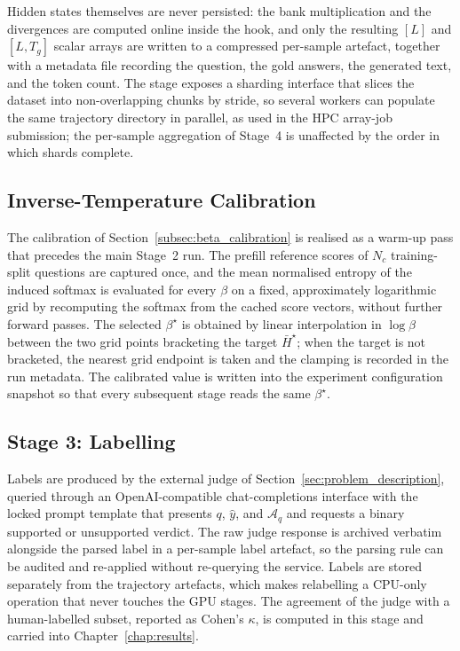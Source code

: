 Hidden states themselves are never persisted: the bank multiplication and
the divergences are computed online inside the hook, and only the resulting
$[L]$ and $[L, T_g]$ scalar arrays are written to a compressed per-sample
artefact, together with a metadata file recording the question, the gold
answers, the generated text, and the token count. The stage exposes a
sharding interface that slices the dataset into non-overlapping chunks by
stride, so several workers can populate the same trajectory directory in
parallel, as used in the HPC array-job submission; the per-sample
aggregation of Stage~4 is unaffected by the order in which shards complete.

\subsection{Inverse-Temperature Calibration}
\label{subsec:impl_beta}

The calibration of Section~\ref{subsec:beta_calibration} is realised as a
warm-up pass that precedes the main Stage~2 run. The prefill reference
scores of $N_c$ training-split questions are captured once, and the mean
normalised entropy of the induced softmax is evaluated for every $\beta$ on
a fixed, approximately logarithmic grid by recomputing the softmax from the
cached score
vectors, without further forward passes. The selected $\beta^\star$ is
obtained by linear interpolation in $\log \beta$ between the two grid
points bracketing the target $\bar{H}^\star$; when the target is not
bracketed, the nearest grid endpoint is taken and the clamping is recorded
in the run metadata. The calibrated value is written into the experiment
configuration snapshot so that every subsequent stage reads the same
$\beta^\star$.

\subsection{Stage 3: Labelling}
\label{subsec:stage3_labeling}

Labels are produced by the external judge of
Section~\ref{sec:problem_description}, queried through an OpenAI-compatible
chat-completions interface with the locked prompt template that presents
$q$, $\hat{y}$, and $\mathcal{A}_q$ and requests a binary supported or
unsupported verdict. The raw judge response is archived verbatim alongside
the parsed label in a per-sample label artefact, so the parsing rule can be
audited and re-applied without re-querying the service. Labels are stored
separately from the trajectory artefacts, which makes relabelling a
CPU-only operation that never touches the GPU stages. The agreement of the
judge with a human-labelled subset, reported as Cohen's $\kappa$, is
computed in this stage and carried into Chapter~\ref{chap:results}.

